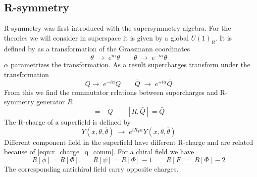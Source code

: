 \begin{appendices}
\subsection{R-symmetry}
R-symmetry was first introduced with the supersymmetry algebra.
For the theories we will consider in superspace it is given by a global $U(1)_R$.
It is defined by as a transformation of the Grassmann coordinates
\begin{equation}
\theta \; \rightarrow \; e^{i \alpha} \theta \qquad \bar{\theta} \; \rightarrow \; e^{-i \alpha} \bar{\theta}
\end{equation}
$\alpha$ parametrizes the transformation.
As a result supercharges transform under the transformation 
\begin{equation}
 Q \rightarrow \; e^{-i \alpha} Q  \qquad \bar{Q} \; \rightarrow \; e^{+i \alpha} \bar{Q}
\end{equation}
From this we find the commutator relations between supercharges and R-symmetry generator $R$
\begin{equation}
[R,Q] = - Q \qquad [R,\bar{Q}] = \bar{Q}
\label{eqn:r_charge_q_comm}
\end{equation}
The R-charge of a superfield is defined by
\begin{equation}
 Y (x, \theta ,\bar{\theta} ) \; \rightarrow \; e^{i R_Y \alpha} Y (x, \theta ,\bar{\theta} ) 
\end{equation}
Different component field in the superfield have different R-charge and are related because of \ref{eqn:r_charge_q_comm}.
For a chiral field we have
\begin{equation}
R[\phi] = R\left [{\Phi}\right] \qquad R[\psi] = R\left [{\Phi}\right] - 1 \qquad R[F] =  R\left [{\Phi}\right] - 2 
\end{equation}
The corresponding antichiral field carry opposite charges.













\end{appendices}
